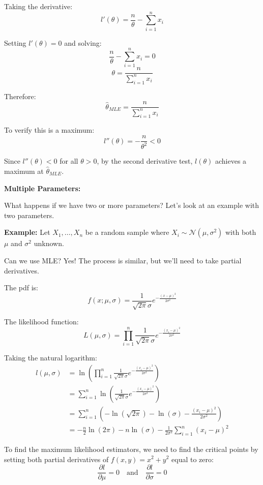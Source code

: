 \documentclass{article}
\begin{document}
   Taking the derivative:
   \[l'(\theta) = \frac{n}{\theta} - \sum_{i=1}^{n} x_i\]

   Setting $l'(\theta) = 0$ and solving:
   \[\frac{n}{\theta} - \sum_{i=1}^{n} x_i = 0\]
   \[\theta = \frac{n}{\sum_{i=1}^{n} x_i}\]

   Therefore:
   \[\hat{\theta}_{MLE} = \frac{n}{\sum_{i=1}^{n} x_i}\]

   To verify this is a maximum:
   \[l''(\theta) = -\frac{n}{\theta^2} < 0\]

   Since $l''(\theta) < 0$ for all $\theta > 0$, by the second derivative test, $l(\theta)$ achieves a maximum at $\hat{\theta}_{MLE}$.

\textbf{Multiple Parameters:}

What happens if we have two or more parameters? Let's look at an example with two parameters.

\textbf{Example:} Let $X_1, \ldots, X_n$ be a random sample where $X_i \sim \mathcal{N}(\mu, \sigma^2)$ with both $\mu$ and $\sigma^2$ unknown.

Can we use MLE? Yes! The process is similar, but we'll need to take partial derivatives.

The pdf is:
\[f(x; \mu, \sigma) = \frac{1}{\sqrt{2\pi}\sigma}e^{-\frac{(x-\mu)^2}{2\sigma^2}}\]

The likelihood function:
\[L(\mu, \sigma) = \prod_{i=1}^{n} \frac{1}{\sqrt{2\pi}\sigma}e^{-\frac{(x_i-\mu)^2}{2\sigma^2}}\]

Taking the natural logarithm:
\begin{align*}
    l(\mu, \sigma) &= \ln\left(\prod_{i=1}^{n} \frac{1}{\sqrt{2\pi}\sigma}e^{-\frac{(x_i-\mu)^2}{2\sigma^2}}\right) \\
    &= \sum_{i=1}^{n}\ln\left(\frac{1}{\sqrt{2\pi}\sigma}e^{-\frac{(x_i-\mu)^2}{2\sigma^2}}\right) \\
    &= \sum_{i=1}^{n}\left(-\ln(\sqrt{2\pi}) - \ln(\sigma) - \frac{(x_i-\mu)^2}{2\sigma^2}\right) \\
    &= -\frac{n}{2}\ln(2\pi) - n\ln(\sigma) - \frac{1}{2\sigma^2}\sum_{i=1}^{n}(x_i-\mu)^2
\end{align*}

To find the maximum likelihood estimators, we need to find the critical points by setting both partial derivatives of $f(x, y) = x^2 + y^2$ equal to zero:
\[\frac{\partial l}{\partial \mu} = 0 \quad \text{and} \quad \frac{\partial l}{\partial \sigma} = 0\]
\end{document}
